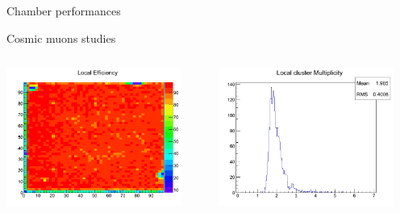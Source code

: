 \documentclass[10pt]{beamer}
\begin{document}
\begin{frame}{Chamber performances  }
\begin{block}{ Cosmic muons studies}
  \begin{columns}

      \begin{column}{0.5\textwidth}
        \centerline{\includegraphics[width=0.9\textwidth]{images/LocalEfficiency}}
      \end{column}
      \begin{column}{0.5\textwidth}
        \centerline{\includegraphics[width=0.9\textwidth]{images/LocalMultiplicity}}
      \end{column}
    \end{columns}
\end{block}

\end{frame}
\end{document}

